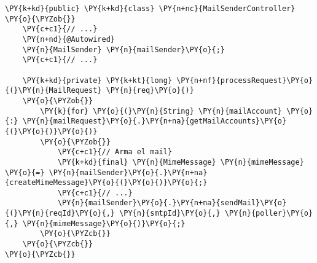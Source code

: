 \begin{Verbatim}[commandchars=\\\{\}]
\PY{k+kd}{public} \PY{k+kd}{class} \PY{n+nc}{MailSenderController}
\PY{o}{\PYZob{}}
    \PY{c+c1}{// ...}
    \PY{n+nd}{@Autowired}
    \PY{n}{MailSender} \PY{n}{mailSender}\PY{o}{;}
    \PY{c+c1}{// ...}
    
    \PY{k+kd}{private} \PY{k+kt}{long} \PY{n+nf}{processRequest}\PY{o}{(}\PY{n}{MailRequest} \PY{n}{req}\PY{o}{)}
    \PY{o}{\PYZob{}}
        \PY{k}{for} \PY{o}{(}\PY{n}{String} \PY{n}{mailAccount} \PY{o}{:} \PY{n}{mailRequest}\PY{o}{.}\PY{n+na}{getMailAccounts}\PY{o}{(}\PY{o}{)}\PY{o}{)}
        \PY{o}{\PYZob{}}
            \PY{c+c1}{// Arma el mail}
            \PY{k+kd}{final} \PY{n}{MimeMessage} \PY{n}{mimeMessage} \PY{o}{=} \PY{n}{mailSender}\PY{o}{.}\PY{n+na}{createMimeMessage}\PY{o}{(}\PY{o}{)}\PY{o}{;}
            \PY{c+c1}{// ...}
            \PY{n}{mailSender}\PY{o}{.}\PY{n+na}{sendMail}\PY{o}{(}\PY{n}{reqId}\PY{o}{,} \PY{n}{smtpId}\PY{o}{,} \PY{n}{poller}\PY{o}{,} \PY{n}{mimeMessage}\PY{o}{)}\PY{o}{;}
        \PY{o}{\PYZcb{}}
    \PY{o}{\PYZcb{}}
\PY{o}{\PYZcb{}}
\end{Verbatim}
